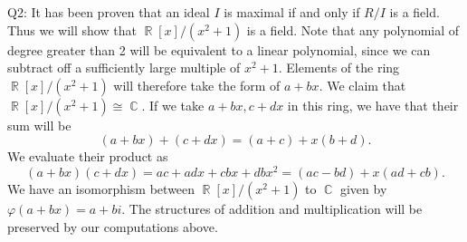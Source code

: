 \documentclass[letterpaper]{article}
\DeclareMathOperator{\R}{\mathbb{R}}
\DeclareMathOperator{\C}{\mathbb{C}}
\begin{document}
 
\noindent Q2: It has been proven that an ideal $I$ is maximal if and only if $R/ I$ is a field. Thus we will show that $\R[x]/(x^2+1)$ is a field. Note that any polynomial of degree greater than 2 will be equivalent to a linear polynomial, since we can subtract off a sufficiently large multiple of $x^2+1$. Elements of the ring $\R[x]/ (x^2+1)$ will therefore take the form of $a+bx$. We claim that $\R[x]/(x^2+1) \cong \C$. If we take $a+bx,c+dx$ in this ring, we have that their sum will be $$(a+bx)+(c+dx) = (a+c)+x(b+d).$$
We evaluate their product as $$(a+bx)(c+dx) = ac + adx + cbx + dbx^2 = (ac- bd)+x(ad+cb).$$
We have an isomorphism between $\R[x]/(x^2+1)$ to $\C$ given by $\varphi(a+bx) = a+bi$. The structures of addition and multiplication will be preserved by our computations above. 
\end{document}
